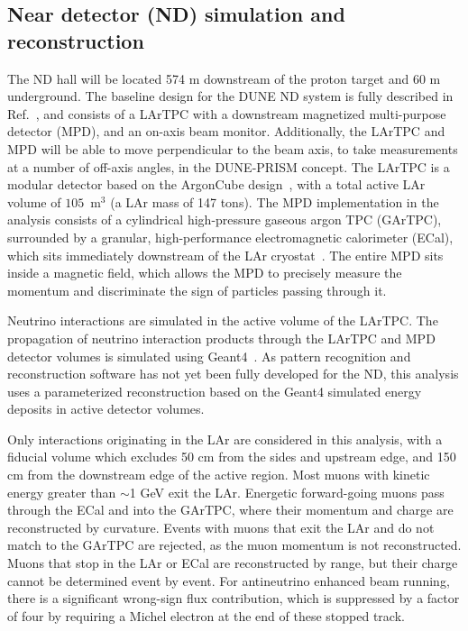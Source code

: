 \subsection{Near detector (ND) simulation and reconstruction}
The ND hall will be located 574 m downstream of the proton target and 60 m underground. The baseline design for the DUNE ND system is fully described in Ref.~\cite{AbedAbud:2021hpb}, and consists of a LArTPC with a downstream magnetized multi-purpose detector (MPD), and an on-axis beam monitor. Additionally, the LArTPC and MPD will be able to move perpendicular to the beam axis, to take measurements at a number of off-axis angles, in the DUNE-PRISM concept. The LArTPC is a modular detector based on the ArgonCube design~\cite{argoncube_loi, Dwyer:2018phu, arclight}, with a total active LAr volume of $105$~m$^{3}$ (a LAr mass of 147 tons). The MPD implementation in the analysis consists of a cylindrical high-pressure gaseous argon TPC (GArTPC), surrounded by a granular, high-performance electromagnetic calorimeter (ECal), which sits immediately downstream of the LAr cryostat~\cite{Emberger:2018pgr}. The entire MPD sits inside a magnetic field, which allows the MPD to precisely measure the momentum and discriminate the sign of particles passing through it.

Neutrino interactions are simulated in the active volume of the LArTPC. The propagation of neutrino interaction products through the LArTPC and MPD detector volumes is simulated using Geant4~\cite{Agostinelli:2002hh}. As pattern recognition and reconstruction software has not yet been fully developed for the ND, this analysis uses a parameterized reconstruction based on the Geant4 simulated energy deposits in active detector volumes.

Only interactions originating in the LAr are considered in this analysis, with a fiducial volume which excludes 50 cm from the sides and upstream edge, and 150 cm from the downstream edge of the active region. Most muons with kinetic energy greater than $\sim$1 GeV exit the LAr. Energetic forward-going muons pass through the ECal and into the GArTPC, where their momentum and charge are reconstructed by curvature. Events with muons that exit the LAr and do not match to the GArTPC are rejected, as the muon momentum is not reconstructed. Muons that stop in the LAr or ECal are reconstructed by range, but their charge cannot be determined event by event. For antineutrino enhanced beam running, there is a significant wrong-sign flux contribution, which is suppressed by a factor of four by requiring a Michel electron at the end of these stopped track.

